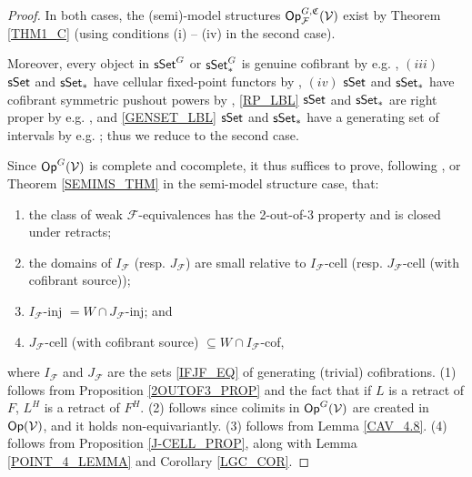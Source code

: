 \documentclass[a4paper,10pt
,draft
]{article}%
\renewcommand{\F}{\mathcal F}
\renewcommand{\1}{\eta}%
\begin{document}
\begin{proof}
      In both cases, the (semi)-model structures $\Op_\F^{G, \mathfrak C}(\V)$ exist by Theorem \ref{THM1_C}
      (using conditions (i) -- (iv) in the second case).
      
      Moreover,
      every object in $\mathsf{sSet}^G$ or $\sSet^G_{\**}$ is genuine cofibrant by e.g. \cite[Remark 5.71]{BP_geo},
      $(iii)$ $\mathsf{sSet}$ and $\sSet_{\**}$ have cellular fixed-point functors by \cite[Example 2.14]{Ste16},
      $(iv)$ $\mathsf{sSet}$ and $\sSet_{\**}$ have cofibrant symmetric pushout powers by \cite[Remark 6.18]{BP_geo},
      \ref{RP_LBL} $\mathsf{sSet}$ and $\sSet_{\**}$ are right proper by e.g. \cite[Thm. 2.1.1 and Prop 4.1.1]{JT_simp},
      and
      \ref{GENSET_LBL} $\mathsf{sSet}$ and $\sSet_{\**}$ have a generating set of intervals
      by e.g. \cite[Lemma 1.12]{BM13};
      thus we reduce to the second case.
      
      Since $\mathsf{Op}^G(\mathcal V)$ is complete and cocomplete, it thus suffices to prove,
      following \cite[Theorem 2.1.19]{Hov}, or Theorem \ref{SEMIMS_THM} in the semi-model structure case, that:
      \begin{enumerate}[label = (\arabic*)]
      \item the class of weak $\F$-equivalences has the 2-out-of-3 property and is closed under retracts;
      \item the domains of $I_{\F}$ (resp. $J_{\F}$) are small relative to $I_{\F}$-cell (resp. $J_{\F}$-cell (with cofibrant source));
      \item $I_{\F}$-inj $= W\cap J_{\F}$-inj; and
      \item $J_{\F}$-cell (with cofibrant source) $\subseteq W\cap I_{\F}$-cof,
      \end{enumerate}
      where $I_\F$ and $J_\F$ are the sets \eqref{IFJF_EQ} of generating (trivial) cofibrations.
      (1) follows from Proposition \ref{2OUTOF3_PROP} and the fact that if $L$ is a retract of $F$, $L^H$ is a retract of $F^H$.
      (2) follows since colimits in $\mathsf{Op}^G(\mathcal V)$ are created in $\mathsf{Op}(\mathcal V)$, and it holds non-equivariantly.
      (3) follows from Lemma \ref{CAV_4.8}.
      (4) follows from Proposition \ref{J-CELL_PROP}, along with Lemma \ref{POINT_4_LEMMA} and Corollary \ref{LGC_COR}.
\end{proof}
\end{document}
